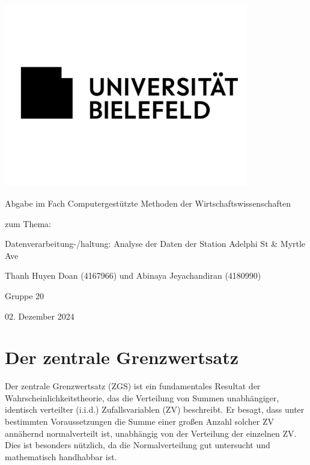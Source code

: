 \documentclass[a4paper,12pt]{article}
\begin{document}
\begin{titlepage}
    \centering
    \includegraphics[width=0.8\textwidth]{uni-bielefeld-logo-1100x825.jpg}  %
    \vfill
    
    {\Huge Abgabe im Fach Computergestützte Methoden der Wirtschaftswissenschaften \par}
    \vskip 1cm
    {\Large zum Thema: \par}
    \vskip 0.5cm
    {\LARGE Datenverarbeitung-/haltung: Analyse der Daten der Station Adelphi St \& Myrtle Ave \par}
    \vfill
    {\Large Thanh Huyen Doan (4167966) und Abinaya Jeyachandiran          (4180990) \par} %
    {\large Gruppe 20 \par} %
    {\large 02. Dezember 2024 \par} %
\end{titlepage}




\newpage


\tableofcontents
\listoffigures
\newpage

\section{Der zentrale Grenzwertsatz}
Der zentrale Grenzwertsatz (ZGS) ist ein fundamentales Resultat der Wahrscheinlichkeitstheorie, das die Verteilung von Summen unabhängiger, identisch verteilter (i.i.d.) Zufallsvariablen (ZV) beschreibt. Er besagt, dass unter bestimmten Voraussetzungen die Summe einer großen Anzahl solcher ZV annähernd normalverteilt ist, unabhängig von der Verteilung der einzelnen ZV. Dies ist besonders nützlich, da die Normalverteilung gut untersucht und mathematisch handhabbar ist.
\end{document}
